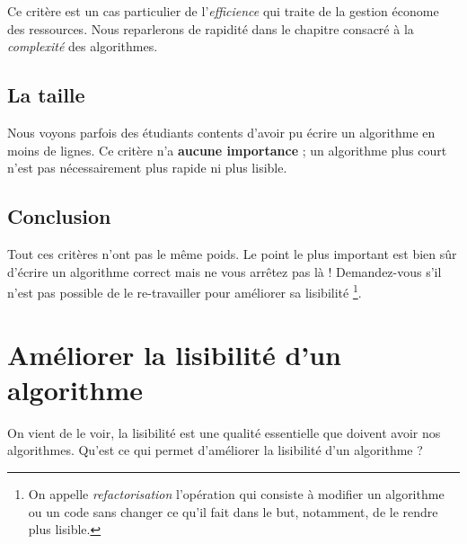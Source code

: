 			Ce critère est un cas particulier de l'\emph{efficience}
			qui traite de la gestion économe des ressources.
			Nous reparlerons de rapidité
			dans le chapitre consacré à la \emph{complexité}
			des algorithmes.
		
		\subsection{La taille}
		
			Nous voyons parfois des étudiants contents d'avoir
			pu écrire un algorithme en moins de lignes.
			Ce critère n'a \textbf{aucune importance} ;
			un algorithme plus court n'est pas nécessairement
			plus rapide ni plus lisible.
		
		\subsection{Conclusion}
			
			Tout ces critères n'ont pas le même poids.
			Le point le plus important est bien sûr d'écrire
			un algorithme correct mais ne vous arrêtez pas là !
			Demandez-vous s'il n'est pas possible de le re-travailler
			pour améliorer sa lisibilité%
			\footnote{%
				On appelle \emph{refactorisation}
				l'opération qui consiste à modifier
				un algorithme ou un code
				sans changer ce qu'il fait
				dans le but,
				notamment, de le rendre plus lisible.
			}.
		
	\section{Améliorer la lisibilité d'un algorithme}\label{lisibilite}
		
		On vient de le voir, la lisibilité est une qualité essentielle
		que doivent avoir nos algorithmes.
		Qu'est ce qui permet d'améliorer la lisibilité d'un algorithme ?
		
